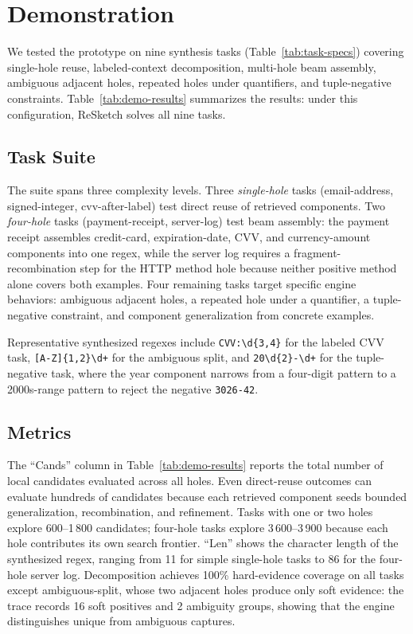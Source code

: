 \documentclass[sigconf,nonacm]{acmart}
\begin{document}
\section{Demonstration}
We tested the prototype on nine synthesis tasks
(Table~\ref{tab:task-specs}) covering single-hole reuse, labeled-context
decomposition, multi-hole beam assembly, ambiguous adjacent holes, repeated
holes under quantifiers, and tuple-negative constraints.
Table~\ref{tab:demo-results} summarizes the results: under this configuration,
ReSketch solves all nine tasks.

\subsection{Task Suite}
The suite spans three complexity levels. Three \emph{single-hole} tasks
(email-address, signed-integer, cvv-after-label) test direct reuse of
retrieved components. Two \emph{four-hole} tasks (payment-receipt, server-log)
test beam assembly: the payment receipt assembles credit-card, expiration-date,
CVV, and currency-amount components into one regex, while the server log
requires a fragment-recombination step for the HTTP method hole because neither
positive method alone covers both examples. Four remaining tasks target
specific engine behaviors: ambiguous adjacent holes, a repeated hole under a
quantifier, a tuple-negative constraint, and component generalization from
concrete examples.

Representative synthesized regexes include
\texttt{CVV:\textbackslash d\{3,4\}} for the labeled CVV task,
\texttt{[A-Z]\{1,2\}\textbackslash d+} for the ambiguous split, and
\texttt{20\textbackslash d\{2\}-\textbackslash d+} for the
tuple-negative task, where the year component narrows from a four-digit
pattern to a 2000s-range pattern to reject the negative \texttt{3026-42}.

\subsection{Metrics}
The ``Cands'' column in Table~\ref{tab:demo-results} reports the total number
of local candidates evaluated across all holes. Even direct-reuse outcomes can
evaluate hundreds of candidates because each retrieved component seeds bounded
generalization, recombination, and refinement. Tasks with one or two holes
explore 600--1\,800 candidates; four-hole tasks explore 3\,600--3\,900 because
each hole contributes its own search frontier. ``Len'' shows the character length
of the synthesized regex, ranging from 11 for simple single-hole tasks to 86
for the four-hole server log. Decomposition achieves 100\% hard-evidence
coverage on all tasks except ambiguous-split, whose two adjacent holes produce
only soft evidence: the trace records 16 soft positives and 2 ambiguity
groups, showing that the engine distinguishes unique from
ambiguous captures.
\end{document}
